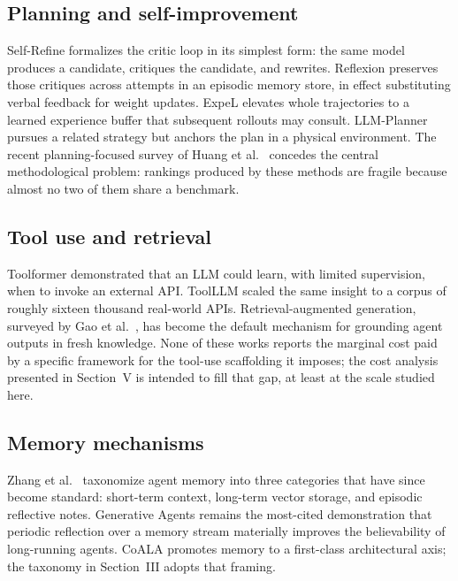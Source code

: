 \documentclass[conference]{IEEEtran}
\begin{document}
\subsection{Planning and self-improvement}
Self-Refine \cite{madaan2023selfrefine} formalizes the critic loop in
its simplest form: the same model produces a candidate, critiques the
candidate, and rewrites. Reflexion \cite{shinn2023reflexion} preserves
those critiques across attempts in an episodic memory store, in
effect substituting verbal feedback for weight updates. ExpeL
\cite{zhao2024expel} elevates whole trajectories to a learned
experience buffer that subsequent rollouts may consult. LLM-Planner
\cite{song2023llmplanner} pursues a related strategy but anchors the
plan in a physical environment. The recent planning-focused survey
of Huang et al.\ \cite{huang2024understanding} concedes the central
methodological problem: rankings produced by these methods are
fragile because almost no two of them share a benchmark.

\subsection{Tool use and retrieval}
Toolformer \cite{schick2023toolformer} demonstrated that an LLM could
learn, with limited supervision, when to invoke an external API.
ToolLLM \cite{qin2024toolllm} scaled the same insight to a corpus of
roughly sixteen thousand real-world APIs. Retrieval-augmented
generation, surveyed by Gao et al.\ \cite{lewis2023ragsurvey}, has
become the default mechanism for grounding agent outputs in fresh
knowledge. None of these works reports the marginal cost paid by a
specific framework for the tool-use scaffolding it imposes; the cost
analysis presented in Section~V is intended to fill that gap, at
least at the scale studied here.

\subsection{Memory mechanisms}
Zhang et al.\ \cite{zhang2024llmagentsurvey} taxonomize agent memory
into three categories that have since become standard: short-term
context, long-term vector storage, and episodic reflective notes.
Generative Agents \cite{park2023generative} remains the most-cited
demonstration that periodic reflection over a memory stream
materially improves the believability of long-running agents. CoALA
\cite{sumers2024coala} promotes memory to a first-class architectural
axis; the taxonomy in Section~III adopts that framing.
\end{document}
